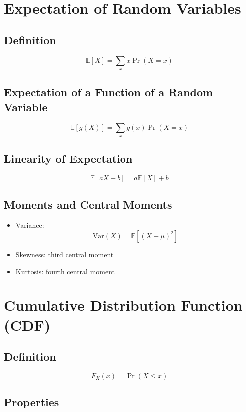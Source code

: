 \documentclass[11pt]{article}
\begin{document}
\section{Expectation of Random Variables}

\subsection{Definition}

\[
\mathbb{E}[X] = \sum_x x \Pr(X=x)
\]

\subsection{Expectation of a Function of a Random Variable}

\[
\mathbb{E}[g(X)] = \sum_x g(x)\Pr(X=x)
\]

\subsection{Linearity of Expectation}

\[
\mathbb{E}[aX+b] = a\mathbb{E}[X] + b
\]

\subsection{Moments and Central Moments}

\begin{itemize}
    \item Variance:
    \[
    \text{Var}(X) = \mathbb{E}[(X-\mu)^2]
    \]
    \item Skewness: third central moment
    \item Kurtosis: fourth central moment
\end{itemize}

\section{Cumulative Distribution Function (CDF)}

\subsection{Definition}

\[
F_X(x) = \Pr(X \le x)
\]

\subsection{Properties}
\end{document}
